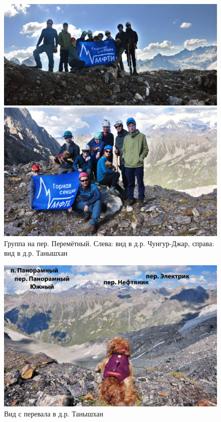\begin{figure}[h!]
	\centering
	\begin{minipage}[h]{0.55\linewidth}
		\includegraphics[width=0.99\linewidth]{../pics/DSC_0412 2.jpg}
	\end{minipage}
	\hfill
	\begin{minipage}[h]{0.45\linewidth}
		\includegraphics[width=0.99\linewidth]{../pics/DSC_0419 2.jpg}
	\end{minipage}
	\caption{Группа на пер. Перемётный. Слева: вид в д.р. Чунгур-Джар, справа: вид в д.р. Танышхан}
	\label{fig:DSC_0412}
\end{figure}


\begin{figure}[h!]
	\centering
	\includegraphics[width=0.7\linewidth]{../pics/DSC_0385 2.jpg}
	\caption{Вид с перевала в д.р. Танышхан}
	\label{fig:DSC_0385 2}
\end{figure} 



